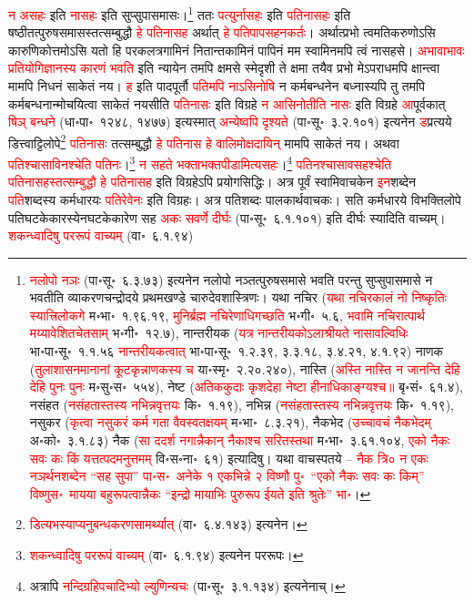 \begin{sloppypar}
\textcolor{red}{न असहः} इति \textcolor{red}{नासहः} इति सुप्सुपा\-समासः।\footnote{\textcolor{red}{नलोपो नञः} (पा॰सू॰~६.३.७३) इत्यनेन नलोपो नञ्तत्पुरुष\-समासे भवति परन्तु सुप्सुपा\-समासे न भवतीति व्याकरण\-चन्द्रोदये प्रथम\-खण्डे चारुदेव\-शास्त्रिणः। यथा नचिर (\textcolor{red}{यथा नचिरकालं नो निष्कृतिः स्यात्त्रिलोकगे} म॰भा॰~१.९६.१९, \textcolor{red}{मुनिर्ब्रह्म नचिरेणाधिगच्छति} भ॰गी॰~५.६, \textcolor{red}{भवामि नचिरात्पार्थ मय्यावेशितचेतसाम्‌} भ॰गी॰~१२.७), नान्तरीयक (\textcolor{red}{यत्र नान्तरीयकोऽलाश्रीयते नासावल्विधिः} भा॰पा॰सू॰~१.१.५६ \textcolor{red}{नान्तरीयकत्वात्} भा॰पा॰सू॰~१.२.३९, ३.३.१८, ३.४.२१, ४.१.९२) नाणक (\textcolor{red}{तुलाशासन\-मानानां कूटकृन्नाणकस्य च} या॰स्मृ॰~२.२०.२४०), नास्ति (\textcolor{red}{अस्ति नास्ति न जानन्ति देहि देहि पुनः पुनः} म॰सु॰स॰~५५४), नेष्ट (\textcolor{red}{अतिककुदाः कृशदेहा नेष्टा हीनाधिकाङ्ग्यश्च॥} बृ॰सं॰~६१.४), नसंहत (\textcolor{red}{नसंहतास्तस्य नभिन्नवृत्तयः} कि॰~१.१९), नभिन्न (\textcolor{red}{नसंहतास्तस्य नभिन्नवृत्तयः} कि॰~१.१९), नसुकर (\textcolor{red}{कृत्वा नसुकरं कर्म गता वैवस्वतक्षयम्} म॰भा॰~८.३.२१), नैकभेद (\textcolor{red}{उच्चावचं नैकभेदम्} अ॰को॰~३.१.८३) नैक (\textcolor{red}{सा ददर्श नगान्नैकान् नैकाश्च सरितस्तथा} म॰भा॰~३.६१.१०४, \textcolor{red}{एको नैकः सवः कः किं यत्तत्पदमनुत्तमम्‌} वि॰स॰ना॰~६१) इत्यादिषु। यथा वाचस्पतये – \textcolor{red}{नैक त्रि० न एकः नञर्थनशब्देन “सह सुपा” पा॰स॰~अनेके १ एकभिन्ने २ विष्णौ पु॰~“एको नैकः सवः कः किम्” विष्णुस॰~मायया बहुरूपत्वान्नैकः “इन्द्रो मायाभिः पुरुरूप ईयते इति श्रुतेः” भा॰}।} ततः \textcolor{red}{पत्युर्नासहः} इति \textcolor{red}{पति\-नासहः} इति षष्ठी\-तत्पुरुष\-समासस्तत्सम्बुद्धौ \textcolor{red}{हे पति\-नासह} अर्थात् \textcolor{red}{हे पति\-पाप\-सहन\-कर्तः}। अर्थात्प्रभो त्वमति\-करुणोऽसि कारुणिकोत्तमोऽसि यतो हि पर\-कलत्र\-गामिनं नितान्त\-कामिनं पापिनं मम स्वामिनमपि त्वं नासहसे। \textcolor{red}{अभावाभावः प्रतियोगि\-ज्ञानस्य कारणं भवति} इति न्यायेन तमपि क्षमसे स्मेदृशी ते क्षमा तयैव प्रभो मेऽपराधमपि क्षान्त्वा मामपि निधनं साकेतं नय। \textcolor{red}{ह} इति पाद\-पूर्तौ \textcolor{red}{पतिमपि नाऽसिनोषि} न कर्म\-बन्धनेन बध्नास्यपि तु तमपि कर्म\-बन्धनान्मोचयित्वा साकेतं नयसीति \textcolor{red}{पतिनासः} इति विग्रहे \textcolor{red}{न आसिनोतीति नासः} इति विग्रहे \textcolor{red}{आ}पूर्वकात् \textcolor{red}{षिञ् बन्धने} (धा॰पा॰~१२४८, १४७७) इत्यस्मात् \textcolor{red}{अन्येष्वपि दृश्यते} (पा॰सू॰~३.२.१०१) इत्यनेन \textcolor{red}{ड}\-प्रत्यये डित्त्वाट्टिलोपे\footnote{\textcolor{red}{डित्यभस्याप्यनु\-बन्धकरण\-सामर्थ्यात्‌} (वा॰~६.४.१४३) इत्यनेन।} \textcolor{red}{पतिनासः} तत्सम्बुद्धौ \textcolor{red}{हे पतिनास हे वालि\-मोक्ष\-दायिन्‌} मामपि साकेतं नय। अथवा \textcolor{red}{पतिश्चासाविनश्चेति पतिनः}।\footnote{\textcolor{red}{शकन्ध्वादिषु पर\-रूपं वाच्यम्‌} (वा॰~६.१.९४) इत्यनेन पररूपः।} \textcolor{red}{न सहते भक्ताभक्त\-पीडामित्यसहः}।\footnote{अत्रापि \textcolor{red}{नन्दि\-ग्रहि\-पचादिभ्यो ल्युणिन्यचः} (पा॰सू॰~३.१.१३४) इत्यनेनाच्।} \textcolor{red}{पतिनश्चासावसहश्चेति पतिनासहस्तत्सम्बुद्धौ हे पतिनासह} इति विग्रहेऽपि प्रयोगसिद्धिः। अत्र पूर्वं स्वामि\-वाचकेन \textcolor{red}{इन}\-शब्देन \textcolor{red}{पति}\-शब्दस्य कर्मधारयः \textcolor{red}{पतिरेवेनः} इति विग्रहः। अत्र पति\-शब्दः पालकार्थ\-वाचकः। सति कर्मधारये विभक्ति\-लोपे पति\-घटकेकारस्येन\-घटकेकारेण सह \textcolor{red}{अकः सवर्णे दीर्घः} (पा॰सू॰~६.१.१०१) इति दीर्घः स्यादिति वाच्यम्। \textcolor{red}{शकन्ध्वादिषु पर\-रूपं वाच्यम्‌} (वा॰~६.१.९४) 
\end{sloppypar}
